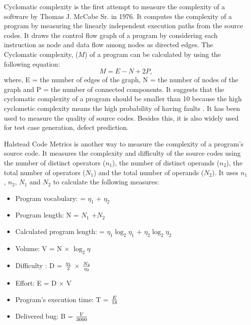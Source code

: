 \documentclass[12pt]{report}
\begin{document}
Cyclomatic complexity is the first attempt to measure the complexity of a software by Thomas J. McCabe Sr. in 1976\cite{mccabe1976complexity}. It computes the complexity of a program by measuring the linearly independent execution paths from the source codes. It draws the control flow graph of a program by considering each instruction as node and data flow among nodes as directed edges. The Cyclomatic complexity, ($M$) of a program can be calculated by using the following equation:  
	\[M = E − N + 2P,\] where,
E = the number of edges of the graph,
N = the number of nodes of the graph and 
P = the number of connected components.
It suggests that the cyclomatic complexity of a program should be smaller than 10 because the high cyclometic complexity means the high probability of having faults \cite{mccabe1976complexity}. It has been used to measure the quality of source codes. Besides this, it is also widely used for test case generation, defect prediction.

Halstead Code Metrics \cite{halstead1977elements} is another way to measure the complexity of a program's source code. It measures the complexity and difficulty of the source codes using the number of distinct operators ($n_{1}$), the number of distinct operands ($n_{2}$), the total number of operators ($N_{1}$) and the total number of operands ($N_{2}$). It uses $n_{1}$, $n_{2}$, $N_{1}$ and $N_{2}$ to calculate the following measures: 

\begin{itemize}
	\item Program vocabulary: \eta = $\eta_1$ + $\eta_2$ \,
	\item Program length: N = $N_1$ +$N_2$ \,
	\item Calculated program length:  = $\eta_1 \log_2 \eta_1$ + $\eta_2 \log_2 \eta_2$ \, 
	\item Volume: V = N $\times$ $\log_2 \eta$ \,
	\item Difficulty : D = { $\eta_1 \over 2 $ } $\times$ { $N_2 \over \eta_2$ } \,
	\item Effort: E =  D $\times$ V \,
	\item Program’s execution time: T = {$E \over 18$}\,
	\item Delivered bug: B = {$V \over 3000$} \,
\end{itemize}
\end{document}
